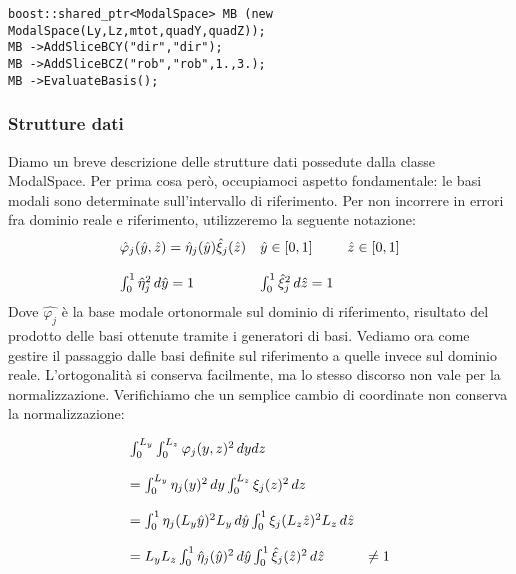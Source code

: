 \begin{lstlisting}[style = general]
boost::shared_ptr<ModalSpace> MB (new ModalSpace(Ly,Lz,mtot,quadY,quadZ));
MB ->AddSliceBCY("dir","dir");
MB ->AddSliceBCZ("rob","rob",1.,3.);
MB ->EvaluateBasis();
\end{lstlisting}

\subsubsection{Strutture dati}
Diamo un breve descrizione delle strutture dati possedute dalla classe ModalSpace. Per prima cosa per\`o, occupiamoci aspetto fondamentale: le basi modali sono determinate sull'intervallo di riferimento. Per non incorrere in errori fra dominio reale e riferimento,  utilizzeremo la seguente notazione:
\begin{equation}
\label{eq: notazione}
\begin{array}{l l l}
\hat{\varphi}_j(\hat{y},\hat{z}) = \hat{\eta}_j(\hat{y}) \hat{\xi}_j(\hat{z}) & \hat{y} \in [0,1] & \hat{z} \in [0,1] 
\\
\\
\int_0^1 \hat{\eta}^2_j\,d\hat{y} = 1 & \int_0^1 \hat{\xi}^2_j\,d\hat{z} = 1
\end{array}
\end{equation}
Dove $\hat{\varphi_j}$ \`e la base modale ortonormale sul dominio di riferimento, risultato del prodotto delle basi ottenute tramite i generatori di basi.
Vediamo ora come gestire il passaggio dalle basi definite sul riferimento a quelle invece sul dominio reale. L'ortogonalit\`a si conserva facilmente, ma lo stesso discorso non vale per la normalizzazione. Verifichiamo che un semplice cambio di coordinate non conserva la normalizzazione:

\begin{equation}
\label{eq: trasformazione}
\begin{array}{l l }
\int_0^{L_y}\int_0^{L_z} \varphi_j(y,z)^2 \,dydz 
\\
\\
= \int_0^{L_y} \eta_j(y)^2 \,dy\int_0^{L_z} \xi_j(z)^2 \,dz 
\\
\\
= \int_0^{1} \eta_j(L_y\hat{y})^2 L_y\,d\hat{y} \int_0^{1} \xi_j(L_z\hat{z})^2 L_z\,d\hat{z} 
\\
\\
 = L_yL_z\int_0^{1} \hat{\eta}_j(\hat{y})^2 \,d\hat{y} \int_0^{1} \hat{\xi}_j(\hat{z})^2 \,d\hat{z} & \neq  1  
\end{array}
\end{equation}

